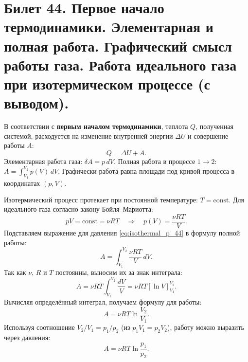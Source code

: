 \section{Билет 44. Первое начало термодинамики. Элементарная и полная работа. Графический смысл работы газа. Работа идеального газа при изотермическом процессе (с выводом).}

\begin{definition}
В соответствии с \textbf{первым началом термодинамики}, теплота $Q$, полученная системой, расходуется на изменение внутренней энергии $\Delta U$ и совершение работы $A$:
\begin{equation}
    Q = \Delta U + A.
\end{equation}
Элементарная работа газа: $\delta A = p \, dV$. Полная работа в процессе $1 \to 2$: $A = \int_{V_1}^{V_2} p(V) \, dV$. Графически работа равна площади под кривой процесса в координатах $(p, V)$.
\end{definition}

\begin{theorem}
Изотермический процесс протекает при постоянной температуре: $T = \text{const}$. Для идеального газа согласно закону Бойля--Мариотта:
\begin{equation}
    p V = \text{const} = \nu R T \quad \Rightarrow \quad p(V) = \frac{\nu R T}{V}. \label{eq:isothermal_p_44}
\end{equation}
Подставляем выражение для давления \eqref{eq:isothermal_p_44} в формулу полной работы:
\begin{equation}
    A = \int_{V_1}^{V_2} \frac{\nu R T}{V} \, dV.
\end{equation}
Так как $\nu$, $R$ и $T$ постоянны, выносим их за знак интеграла:
\begin{equation}
    A = \nu R T \int_{V_1}^{V_2} \frac{dV}{V} = \nu R T \left[ \ln V \right]_{V_1}^{V_2}.
\end{equation}
Вычисляя определённый интеграл, получаем формулу для работы:
\begin{equation}
    A = \nu R T \ln \frac{V_2}{V_1}. \label{eq:work_isothermal_V}
\end{equation}
Используя соотношение $V_2/V_1 = p_1/p_2$ (из $p_1 V_1 = p_2 V_2$), работу можно выразить через давления:
\begin{equation}
    A = \nu R T \ln \frac{p_1}{p_2}. \label{eq:work_isothermal_p}
\end{equation}
\end{theorem}

